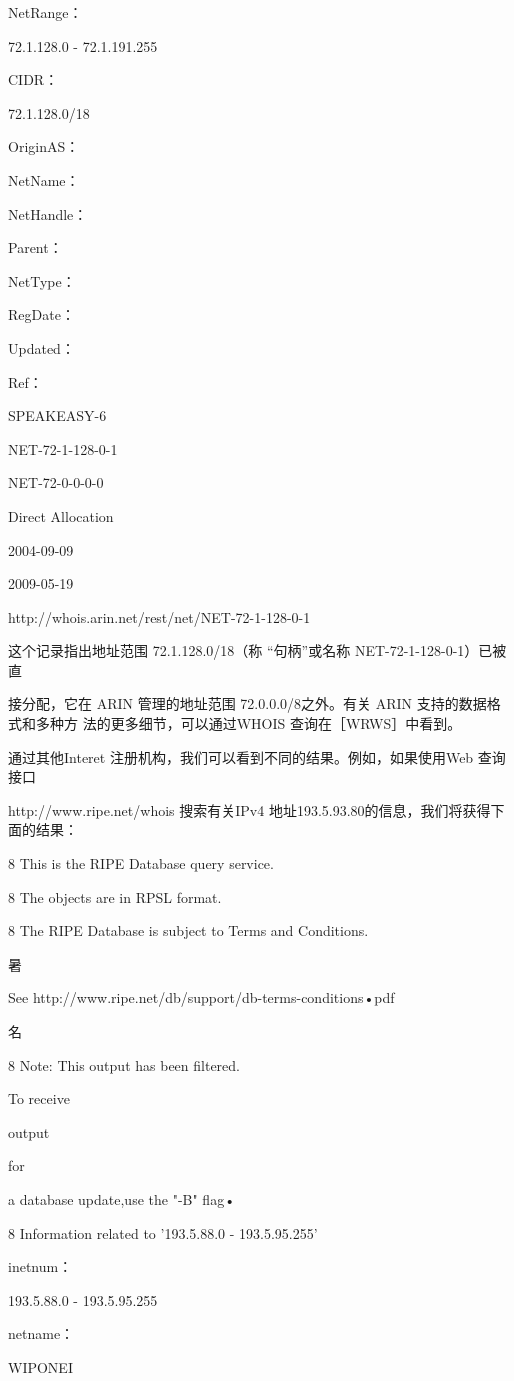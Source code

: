 NetRange：

72.1.128.0 - 72.1.191.255

CIDR：

72.1.128.0/18

OriginAS：

NetName：

NetHandle：

Parent：

NetType：

RegDate：

Updated：

Ref：

SPEAKEASY-6

NET-72-1-128-0-1

NET-72-0-0-0-0

Direct Allocation

2004-09-09

2009-05-19

http://whois.arin.net/rest/net/NET-72-1-128-0-1

这个记录指出地址范围 72.1.128.0/18（称 “句柄”或名称 NET-72-1-128-0-1）已被直

接分配，它在 ARIN 管理的地址范围 72.0.0.0/8之外。有关 ARIN 支持的数据格式和多种方
法的更多细节，可以通过WHOIS 查询在［WRWS］中看到。

通过其他Interet 注册机构，我们可以看到不同的结果。例如，如果使用Web 查询接口

http://www.ripe.net/whois 搜索有关IPv4 地址193.5.93.80的信息，我们将获得下面的结果：

8 This is the RIPE Database query service.

8 The objects are in RPSL format.

8 The RIPE Database is subject to Terms and Conditions.

暑

See http://www.ripe.net/db/support/db-terms-conditions•pdf

名

8 Note: This output has been filtered.

To receive

output

for

a database update,use the "-B" flag•

8 Information related to '193.5.88.0 - 193.5.95.255'

inetnum：

193.5.88.0 - 193.5.95.255

netname：

WIPONEI


